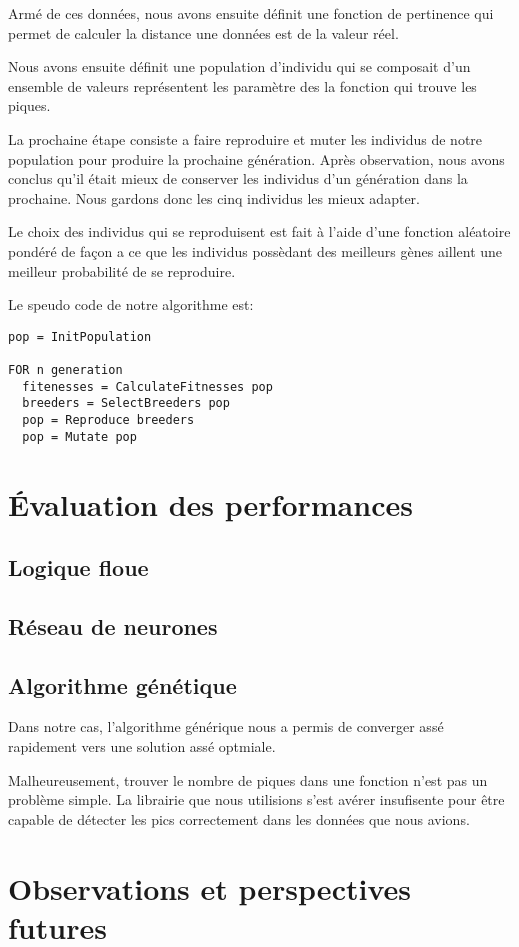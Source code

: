 \documentclass[12pt,letterpaper]{article}
\begin{document}
Armé de ces données, nous avons ensuite définit une fonction de pertinence qui permet de calculer la distance une données est de 
la valeur réel. 

Nous avons ensuite définit une population d'individu qui se composait d'un ensemble de valeurs représentent les paramètre des la
fonction qui trouve les piques. 

La prochaine étape consiste a faire reproduire et muter les individus de notre population pour produire la prochaine génération. Après 
observation, nous avons conclus qu'il était mieux de conserver les individus d'un génération dans la prochaine. Nous gardons donc les 
cinq individus les mieux adapter. 

Le choix des individus qui se reproduisent est fait à l'aide d'une fonction aléatoire pondéré de façon a ce que les individus possèdant
des meilleurs gènes aillent une meilleur probabilité de se reproduire. 

Le speudo code de notre algorithme est:

\begin{verbatim}
pop = InitPopulation

FOR n generation
  fitenesses = CalculateFitnesses pop
  breeders = SelectBreeders pop
  pop = Reproduce breeders
  pop = Mutate pop

\end{verbatim}


\section{Évaluation des performances}

\subsection{Logique floue}

\subsection{Réseau de neurones}

\subsection{Algorithme génétique}

Dans notre cas, l'algorithme générique nous a permis de converger assé rapidement vers une solution assé optmiale. 

Malheureusement, trouver le nombre de piques dans une fonction n'est pas un problème simple. La librairie que nous utilisions 
s'est avérer insufisente pour être capable de détecter les pics correctement dans les données que nous avions. 


\section{Observations et perspectives futures}
\end{document}
